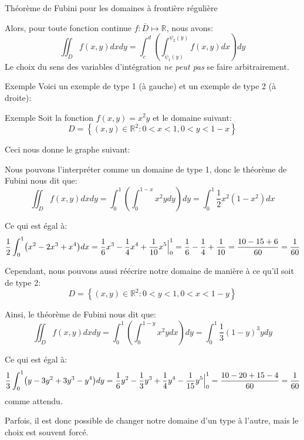 \documentclass[a4paper]{article}
\begin{document}
\begin{parag}{Théorème de Fubini pour les domaines à frontière régulière}
\begin{enumerate}[left=0pt]
            Alors, pour toute fonction continue $f: \bar{D} \mapsto \mathbb{R}$, nous avons: 
            \[\iint_D f\left(x, y\right)dxdy = \int_{c}^{d} \left(\int_{\psi_1\left(y\right)}^{\psi_2\left(y\right)} f\left(x, y\right)dx\right)dy\]
            Le choix du sens des variables d'intégration \textit{ne peut pas} se faire arbitrairement.
    \end{enumerate}

    \begin{subparag}{Exemple}
        Voici un exemple de type 1 (à gauche) et un exemple de type 2 (à droite):
    \end{subparag}
\end{parag}

\begin{parag}{Exemple}
    Soit la fonction $f\left(x, y\right) = x^2 y$ et le domaine suivant: 
    \[D = \left\{\left(x, y\right) \in \mathbb{R}^2 : 0 < x < 1, 0 < y < 1 - x\right\}\]
    
    Ceci nous donne le graphe suivant:

    Nous pouvons l'interpréter comme un domaine de type 1, donc le théorème de Fubini nous dit que: 
    \[\iint_D f\left(x,y\right)dxdy = \int_{0}^{1} \left(\int_{0}^{1 - x}  x^2 y dy\right)dy = \int_{0}^{1} \frac{1}{2}x^2 \left(1 - x^2\right)dx\]

    Ce qui est égal à: 
    \[\frac{1}{2} \int_{0}^{1} \left(x^2 - 2x^3 + x^4\right)dx = \frac{1}{6} x^3 - \frac{1}{4}x^4 + \frac{1}{10}x^5 \eval_{0}^{1} = \frac{1}{6}- \frac{1}{4} + \frac{1}{10} = \frac{10 - 15 + 6}{60} = \frac{1}{60}\]
    
    
    Cependant, nous pouvons aussi réécrire notre domaine de manière à ce qu'il soit de type 2: 
    \[D = \left\{\left(x, y\right) \in \mathbb{R}^2 : 0 < y < 1, 0 < x < 1 - y\right\}\]
    
    Ainsi, le théorème de Fubini nous dit que: 
    \[\iint_D f\left(x, y\right)dxdy = \int_{0}^{1} \left(\int_{0}^{1 -y} x^2 y dx\right)dy = \int_{0}^{1} \frac{1}{3}\left(1-y\right)^3 ydy\]
    
    Ce qui est égal à:
    \[\frac{1}{3} \int_{0}^{1} \left(y - 3y^2 + 3y^3 - y^4\right)dy = \frac{1}{6}y^2 - \frac{1}{3}y^3 + \frac{1}{4}y^4 - \frac{1}{15}y^5 \eval_{0}^{1} = \frac{10 - 20 + 15 - 4}{60} = \frac{1}{60}\]
    comme attendu.

    Parfois, il est donc possible de changer notre domaine d'un type à l'autre, mais le choix est souvent forcé.
\end{parag}
\end{document}
